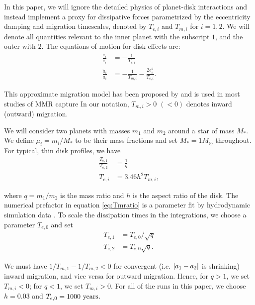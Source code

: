 \documentclass[usenatbib,onecolumn]{mnras}
\DeclarePairedDelimiter{\abs}{|}{|}
\begin{document}
In this paper, we will ignore the detailed physics of planet-disk
interactions and instead implement a proxy for dissipative forces
parametrized by the eccentricity damping and migration timescales,
denoted by \(T_{e,i}\) and \(T_{m,i}\) for \(i=1,2\).  We will denote all
quantities relevant to the inner planet with the subscript \(1\), and the
outer with \(2\).  The equations of motion for disk effects are:
\begin{align}\label{eq:disforce}
  \frac{\dot{e}_i}{e_i} &= -\frac{1}{T_{e,i}} \\
\label{eq:disforce1}
  \frac{\dot{a}_i}{a_i} &= -\frac{1}{T_{m,i}} -\frac{2e_i^2}{T_{e,i}}.
\end{align}

\noindent This approximate migration model has been proposed
by \citet{goldreich_disk-satellite_1980-1} and is used in most studies
of MMR capture
\citep[e.g.][]{goldreich_overstable_2014,xu_migration_2018} In our
notation, \(T_{m,i}>0\) \((<0)\) denotes inward (outward) migration.

We will consider two planets with masses \(m_1\) and \(m_2\) around a star
of mass \(M_*\). We define \(\mu_i=m_i/M_*\) to be their mass fractions
and set \(M_*=1M_\odot\) throughout. For typical, thin disk profiles, we
have
\citep{tanaka_three-dimensional_2004,cresswell_three-dimensional_2008,xu_migration_2018}
\begin{align}
  \label{eq:Teratio}
  \frac{T_{e,1}}{T_{e,2}}&= \frac1q\\
  \label{eq:Tmratio}
  T_{e,i}&=3.46 h^2 T_{m,i},
\end{align}

\noindent where \(q=m_1/m_2\) is the mass ratio and \(h\) is the
aspect ratio of the disk.
The numerical prefactor in equation \eqref{eq:Tmratio} is a parameter fit 
by hydrodynamic simulation data \citep[for details see][]{cresswell_three-dimensional_2008}.
To scale the dissipation times in the
integrations, we choose a parameter \(T_{e,0}\) and set
\begin{align}
  T_{e,1}&=T_{e,0}/\sqrt{q}\\
  T_{e,2}&= T_{e,0}\sqrt{q}.
\end{align}

\noindent We must have \(1/T_{m,1} - 1/T_{m,2} < 0\) for
convergent (i.e. \(\abs{a_1-a_2}\) is shrinking) inward migration, and
vice versa for outward migration.  Hence, for \(q>1\), we set \(T_{m,i}<
0\); for \(q<1\), we set \(T_{m,i}>0\).  For all of the runs in this paper,
we choose \(h=0.03\) and \(T_{e,0}=1000~\rm{years}\).
\end{document}
